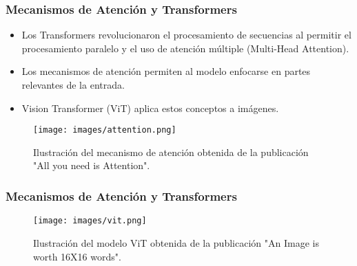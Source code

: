 \begin{frame}
\frametitle{Mecanismos de Atención y Transformers}
\begin{itemize}
    \item Los Transformers revolucionaron el procesamiento de secuencias al permitir el procesamiento paralelo y el uso de atención múltiple (Multi-Head Attention).
    \item Los mecanismos de atención permiten al modelo enfocarse en partes relevantes de la entrada.
    \item Vision Transformer (ViT) aplica estos conceptos a imágenes.
\end{itemize}
\begin{figure}[ht!]
    \centering
    \texttt{[image: images/attention.png]}
    \caption{Ilustración del mecanismo de atención obtenida de la publicación "All you need is Attention".}
\end{figure}
\end{frame}

\begin{frame}
\frametitle{Mecanismos de Atención y Transformers}
\begin{figure}[ht!]
    \centering
    \texttt{[image: images/vit.png]}
    \caption{Ilustración del modelo ViT obtenida de la publicación "An Image is worth 16X16 words".}
\end{figure}
\end{frame}


